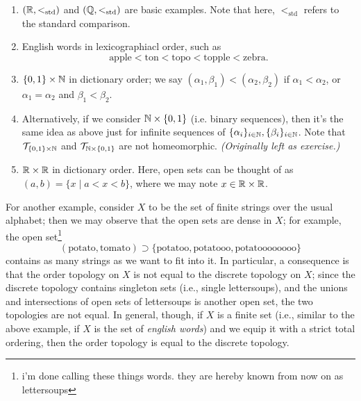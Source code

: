 \begin{enumerate}[label=(\alph*)]
    \item $(\mathbb R, <_\mathrm{std})$ and $(\mathbb Q, <_\mathrm{std})$ are basic examples. Note that here, $<_\mathrm{std}$ refers to the standard comparison.
    \item English words in lexicographiacl order, such as
    \[ \text{apple} < \text{ton} < \text{topo} < \text{topple} < \text{zebra}. \]
    \item $\{0, 1\} \times \mathbb N$ in dictionary order; we say $(\alpha_1, \beta_1) < (\alpha_2, \beta_2)$ if $\alpha_1 < \alpha_2$, or $\alpha_1 = \alpha_2$ and $\beta_1 < \beta_2$.
    \item Alternatively, if we consider $\mathbb N \times \{0, 1\}$ (i.e. binary sequences), then it's the same idea as above just for infinite sequences of $\{\alpha_i\}_{i \in \mathbb N}, \{\beta_i\}_{i \in \mathbb N}$. Note that $\mathcal T_{\{0, 1\} \times \mathbb N}$ and $\mathcal T_{\mathbb N \times \{0, 1\}}$ are not homeomorphic. \textit{(Originally left as exercise.)}
    \item $\mathbb R \times \mathbb R$ in dictionary order. Here, open sets can be thought of as $(a, b) = \{x \mid a < x < b\}$, where we may note $x \in \mathbb R \times \mathbb R$.
\end{enumerate}
\noindent For another example, consider $X$ to be the set of finite strings over the usual alphabet; then we may observe that the open sets are dense in $X$; for example, the open set\footnote{i'm done calling these things words. they are hereby known from now on as lettersoups}
\[ (\text{potato}, \text{tomato}) \supset \{\text{potatoo}, \text{potatooo}, \text{potatoooooooo}\} \]
contains as many strings as we want to fit into it. In particular, a consequence is that the order topology on $X$ is not equal to the discrete topology on $X$; since the discrete topology contains singleton sets (i.e., single lettersoups), and the unions and intersections of open sets of lettersoups is another open set, the two topologies are not equal.
\medskip\newline
\noindent In general, though, if $X$ is a finite set (i.e., similar to the above example, if $X$ is the set of \textit{english words}) and we equip it with a strict total ordering, then the order topology is equal to the discrete topology.

